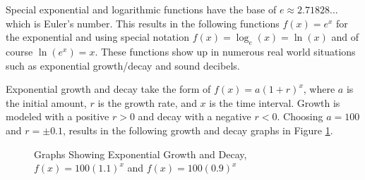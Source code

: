         Special exponential and logarithmic functions have the base of $e \approx 2.71828...$ which is Euler's number. This results in the following functions $f(x) = e^x$ for the exponential and using special notation $f(x) = \log_e(x)=\ln(x)$ and of course $\ln(e^x)=x$. These functions show up in numerous real world situations such as exponential growth/decay and sound decibels.

        \begin{example}
            Exponential growth and decay take the form of $f(x) = a(1+r)^x$, where $a$ is the initial amount, $r$ is the growth rate, and $x$ is the time interval. Growth is modeled with a positive $r > 0$ and decay with a negative $r < 0$. Choosing $a = 100$ and $r = \pm 0.1$, results in the following growth and decay graphs in Figure \ref{fig:growthdecay}.

            \begin{figure}
                \centering
                \caption{Graphs Showing Exponential Growth and Decay, $f(x)=100(1.1)^x$ and $f(x)=100(0.9)^x$}
                \label{fig:growthdecay}
            \end{figure}
        \end{example}

